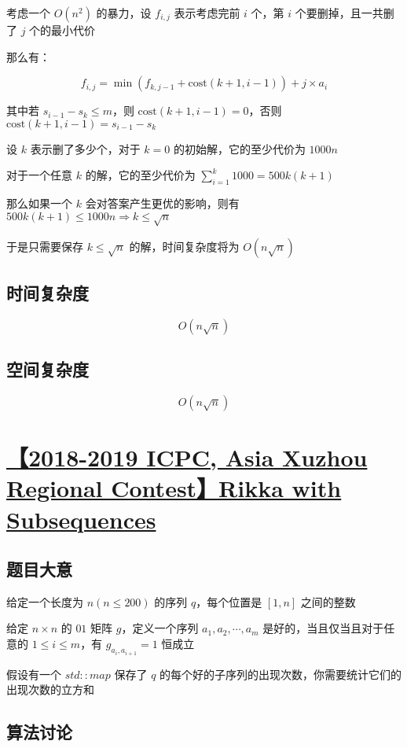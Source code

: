 \documentclass[UTF8]{article}
\begin{document}
考虑一个 $O(n^2)$ 的暴力，设 $f_{i,j}$ 表示考虑完前 $i$ 个，第 $i$ 个要删掉，且一共删了 $j$ 个的最小代价

那么有：

$$
f_{i,j}=\min(f_{k,j-1}+\text{cost}(k+1,i-1))+j \times a_i
$$

其中若 $s_{i-1}-s_{k} \le m$，则 $\text{cost}(k+1,i-1)=0$，否则 $\text{cost}(k+1,i-1)=s_{i-1}-s_{k}$

设 $k$ 表示删了多少个，对于 $k=0$ 的初始解，它的至少代价为 $1000n$

对于一个任意 $k$ 的解，它的至少代价为 $\sum_{i=1}^{k}1000=500k(k+1)$

那么如果一个 $k$ 会对答案产生更优的影响，则有 $500k(k+1) \le 1000n \Rightarrow k \le \sqrt n$

于是只需要保存 $k \le \sqrt n$ 的解，时间复杂度将为 $O(n \sqrt n)$

\subsection{时间复杂度}

$$
O(n \sqrt n)
$$

\subsection{空间复杂度}

$$
O(n \sqrt n)
$$

\section{\href{https://nanti.jisuanke.com/t/34061}{【2018-2019 ICPC, Asia Xuzhou Regional Contest】Rikka with Subsequences}}

\subsection{题目大意}

给定一个长度为 $n(n \le 200)$ 的序列 $q$，每个位置是 $[1, n]$ 之间的整数

给定 $n \times n$ 的 $01$ 矩阵 $g$，定义一个序列 $a_1,a_2, \cdots, a_m$ 是好的，当且仅当且对于任意的 $1 \le i \le m$，有 $g_{a_i,a_{i+1}}=1$ 恒成立

假设有一个 $std::map$ 保存了 $q$ 的每个好的子序列的出现次数，你需要统计它们的出现次数的立方和

\subsection{算法讨论}
\end{document}
